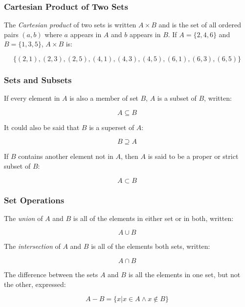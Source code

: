 \documentclass[11pt]{article}
\begin{document}
\subsubsection{Cartesian Product of Two Sets}
\label{sec:org61e0201}

The \emph{Cartesian product} of two sets is written \(A \times B\) and is the set of all ordered pairs \((a, b)\) where \(a\) appears in \(A\) and \(b\) appears in \(B\). If \(A = \{2,4,6\}\) and \(B = \{1,3,5\}\), \(A \times B\) is:

\[\{(2,1), (2,3), (2,5), (4,1), (4,3), (4,5), (6,1), (6,3), (6,5)\}\]

\subsubsection{Sets and Subsets}
\label{sec:org85d99f6}

If every element in \(A\) is also a member of set \(B\), \(A\) is a subset of \(B\), written:

\[A \subseteq B\]

It could also be said that \(B\) is a superset of \(A\):

\[B \supseteq A\]

If \(B\) contains another element not in \(A\), then \(A\) is said to be a proper or strict subset of \(B\):

\[A \subset B\]

\subsubsection{Set Operations}
\label{sec:orgd9e072e}

The \emph{union} of \(A\) and \(B\) is all of the elements in either set or in both, written:


\[A {\displaystyle \cup } B\]

The \emph{intersection} of \(A\) and \(B\) is all of the elements both sets, written:

\[A {\displaystyle \cap } B\]

The difference between the sets \(A\) and \(B\) is all the elements in one set, but not the other, expressed:

\[A - B = \{x | x \in A \wedge x \not\in B\}\]
\end{document}
